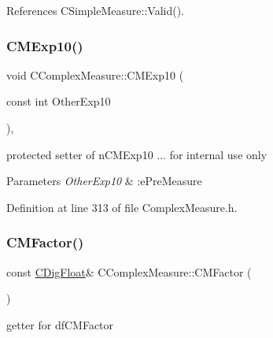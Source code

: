 References C\+Simple\+Measure\+::\+Valid().

\mbox{\label{classCComplexMeasure_aaa6f3cf75ee0dd2a880adaaf43e81168}} 
\subsubsection{\texorpdfstring{C\+M\+Exp10()}{CMExp10()}\hspace{0.1cm}{\footnotesize\ttfamily [2/2]}}
{\footnotesize\ttfamily void C\+Complex\+Measure\+::\+C\+M\+Exp10 (\begin{DoxyParamCaption}\item[{const int}]{Other\+Exp10 }\end{DoxyParamCaption})\hspace{0.3cm}{\ttfamily [inline]}, {\ttfamily [protected]}}



protected setter of n\+C\+M\+Exp10 ... for internal use only 


\begin{DoxyParams}{Parameters}
{\em Other\+Exp10} & \+:e\+Pre\+Measure \\
\hline
\end{DoxyParams}


Definition at line 313 of file Complex\+Measure.\+h.

\mbox{\label{classCComplexMeasure_acdcab22efa233ea1c0e607bf22028afd}} 
\subsubsection{\texorpdfstring{C\+M\+Factor()}{CMFactor()}\hspace{0.1cm}{\footnotesize\ttfamily [1/2]}}
{\footnotesize\ttfamily const \hyperlink{classCDigFloat}{C\+Dig\+Float}\& C\+Complex\+Measure\+::\+C\+M\+Factor (\begin{DoxyParamCaption}{ }\end{DoxyParamCaption})\hspace{0.3cm}{\ttfamily [inline]}}



getter for df\+C\+M\+Factor 

